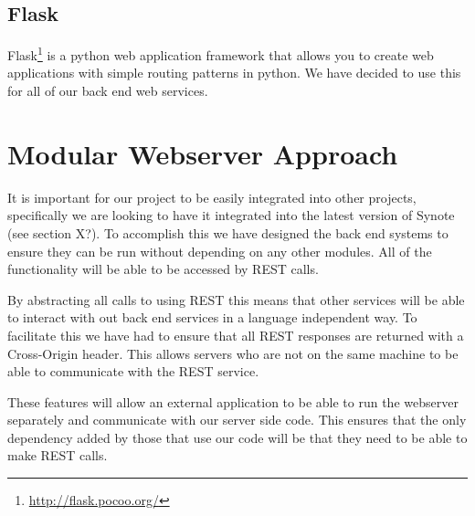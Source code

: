 \subsection{Flask}
\label{Section:Flask}
Flask\footnote{\url{http://flask.pocoo.org/}} is a python web application framework that allows you to create web applications with simple routing patterns in python. We have decided to use this for all of our back end web services.

\section{Modular Webserver Approach}
\label{Section:Modular Approach}
It is important for our project to be easily integrated into other projects, specifically we are looking to have it integrated into the latest version of Synote (see section X?). To accomplish this we have designed the back end systems to ensure they can be run without depending on any other modules. All of the functionality will be able to be accessed by REST calls.

By abstracting all calls to using REST this means that other services will be able to interact with out back end services in a language independent way. To facilitate this we have had to ensure that all REST responses are returned with a Cross-Origin header. This allows servers who are not on the same machine to be able to communicate with the REST service.

These features will allow an external application to be able to run the webserver separately and communicate with our server side code. This ensures that the only dependency added by those that use our code will be that they need to be able to make REST calls.